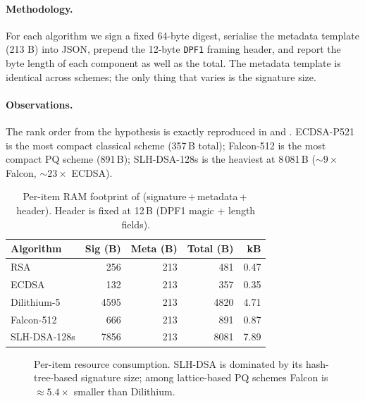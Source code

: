 \documentclass[11pt,a4paper]{article}
\theoremstyle{definition}
\theoremstyle{plain}
\theoremstyle{remark}
\begin{document}
\paragraph{Methodology.}
For each algorithm we sign a fixed 64-byte digest, serialise the
metadata template (213 B) into JSON, prepend the 12-byte
\texttt{DPF1} framing header, and report the byte length of each
component as well as the total. The metadata template is identical
across schemes; the only thing that varies is the signature size.

\paragraph{Observations.}
The rank order from the hypothesis is exactly reproduced in
 and . ECDSA-P521 is the most compact
classical scheme (357\,B total); Falcon-512 is the most compact PQ
scheme (891\,B); SLH-DSA-128s is the heaviest at 8\,081\,B
($\sim 9 \times$ Falcon, $\sim 23 \times$ ECDSA).

\begin{table}[!ht]\centering
\caption{Per-item RAM footprint of (signature\,+\,metadata\,+\,header).
Header is fixed at 12\,B (DPF1 magic + length fields).}\label{tab:exp3}
\small
\begin{tabular}{l r r r r}
\toprule
Algorithm     & Sig (B) & Meta (B) & Total (B) & kB \\
\midrule
RSA           &  256 & 213 &   481 & 0.47 \\
ECDSA         &  132 & 213 &   357 & 0.35 \\
Dilithium-5   & 4595 & 213 & 4820 & 4.71 \\
Falcon-512    &  666 & 213 &  891 & 0.87 \\
SLH-DSA-128s  & 7856 & 213 & 8081 & 7.89 \\
\bottomrule
\end{tabular}
\end{table}

\begin{figure}[!ht]
\centering
{}
\caption{Per-item resource consumption. SLH-DSA is dominated by its
hash-tree-based signature size; among lattice-based PQ schemes Falcon
is $\approx 5.4\!\times$ smaller than Dilithium.}\label{fig:exp3}
\end{figure}
\end{document}

